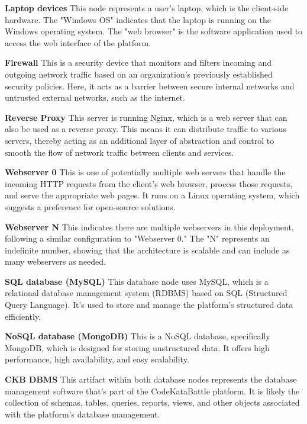 \noindent\textbf{Laptop devices}\newline
This node represents a user's laptop, which is the client-side hardware. The "Windows OS" indicates that the laptop is running on the Windows operating system. 
The "web browser" is the software application used to access the web interface of the platform.

\noindent\textbf{Firewall}\newline
This is a security device that monitors and filters incoming and outgoing network traffic based on an organization's previously established security policies. 
Here, it acts as a barrier between secure internal networks and untrusted external networks, such as the internet.

\noindent\textbf{Reverse Proxy}\newline
This server is running Nginx, which is a web server that can also be used as a reverse proxy. This means it can distribute traffic to various servers, 
thereby acting as an additional layer of abstraction and control to smooth the flow of network traffic between clients and services.

\noindent\textbf{Webserver 0}\newline
This is one of potentially multiple web servers that handle the incoming HTTP requests from the client's web browser, process those requests, 
and serve the appropriate web pages. It runs on a Linux operating system, which suggests a preference for open-source solutions.

\noindent\textbf{Webserver N}\newline
This indicates there are multiple webservers in this deployment, following a similar configuration to "Webserver 0." 
The "N" represents an indefinite number, showing that the architecture is scalable and can include as many webservers as needed.

\noindent\textbf{SQL database (MySQL)}\newline
This database node uses MySQL, which is a relational database management system (RDBMS) based on SQL (Structured Query Language). 
It's used to store and manage the platform's structured data efficiently.

\noindent\textbf{NoSQL database (MongoDB)}\newline
This is a NoSQL database, specifically MongoDB, which is designed for storing unstructured data. It offers high performance, high availability, and easy scalability.

\noindent\textbf{CKB DBMS}\newline
This artifact within both database nodes represents the database management software that's part of the CodeKataBattle platform. It is likely the collection of schemas, 
tables, queries, reports, views, and other objects associated with the platform's database management.

